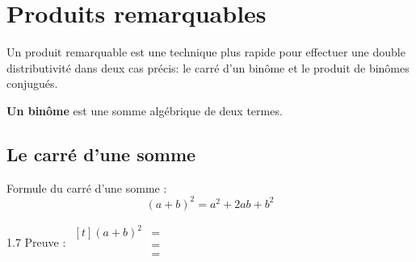 \documentclass[../../syllabus_2.tex]{subfiles}
\begin{document}
\vspace*{6cm}

\newpage
\section{Produits remarquables}
Un produit remarquable est une technique plus rapide pour effectuer une double distributivité 
dans deux cas précis: le carré d'un binôme et le produit de binômes conjugués.

\vspace*{0.5cm}

\textbf{Un binôme} est une somme algébrique de deux termes. 

\subsection{Le carré d'une somme}

Formule du carré d'une somme :
\begin{equation*}
  \left(a+b\right)^2=a^2+2ab+b^2
\end{equation*}

\begin{spacing}{1.7}
Preuve : $
  \begin{aligned}[t]
    \left(a+b\right)^2
     & = \\
     & = \\
     & = \\
  \end{aligned}
$
\end{spacing}
\end{document}
